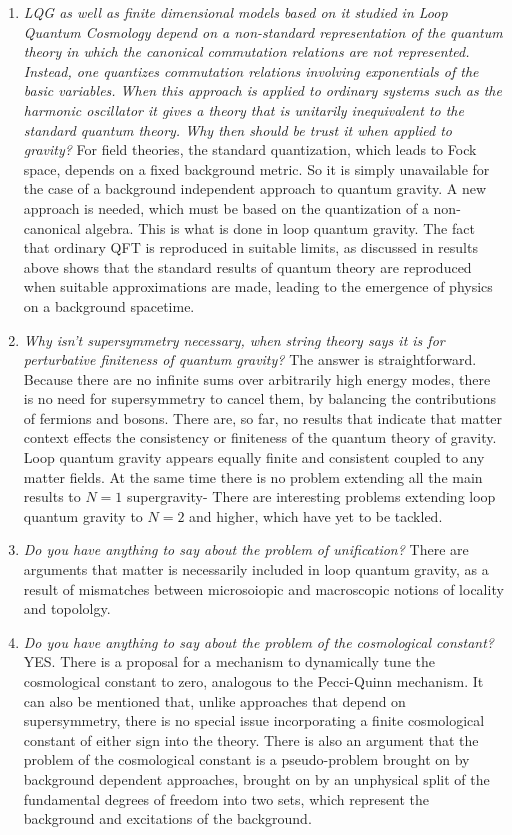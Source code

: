 \documentclass[12pt]{article}
\begin{document}
\begin{enumerate}
\item{}{\it LQG as well as finite dimensional models based on it studied
in Loop Quantum Cosmology depend on a non-standard representation
of the quantum theory in which the canonical commutation relations
are not represented. Instead, one quantizes commutation relations
involving  exponentials of the basic variables.  When this approach is applied to  ordinary systems such as the harmonic oscillator it gives a theory that is
unitarily inequivalent to the standard quantum theory.  Why then should be
trust it when applied to gravity?}   For field theories, the standard quantization,
which leads to Fock space, depends on a fixed background metric. So it is
simply unavailable for the case of a background independent approach to
quantum gravity.  A new approach is needed, which must be based on the
quantization of a non-canonical algebra.  This is what is done in loop quantum
gravity.  The fact that ordinary QFT is reproduced in suitable limits, as discussed
in results above shows that the standard results of quantum theory are 
reproduced when suitable approximations are made, leading to the emergence
of physics on a background spacetime.  
 

\item{}{\it  Why isn't supersymmetry necessary, when string theory says it is for
perturbative finiteness of quantum gravity?  }   The answer is straightforward. Because  there are no infinite sums over arbitrarily high energy modes,  there is no
need for supersymmetry to cancel them, by balancing the contributions of 
fermions and bosons. 
There are, so far,  
no results that indicate that matter context effects the consistency or finiteness
of the quantum theory of gravity.  Loop quantum gravity appears 
equally finite and consistent coupled to any matter fields. At the same time there 
is no problem extending all the main results to $N=1$ supergravity\cite{yime-holo}-\cite{11d}
There are
interesting problems extending loop quantum gravity to $N=2$ and higher, which
have yet to be tackled. 

\item{\it Do you have anything to say about the problem of unification?} 
There are arguments that matter is necessarily included in loop quantum
gravity, as a result of mismatches between microsoiopic and macroscopic
notions of locality\cite{unify} and topololgy\cite{louis-matter}.    


\item{\it Do you have anything to say about the problem of the cosmological
constant?}YES.   There is a proposal for a mechanism to dynamically tune the
cosmological constant to zero, analogous to the Pecci-Quinn 
mechanism\cite{stephon-cc}. 
It can also be mentioned that, unlike approaches that depend on supersymmetry, 
there is no special issue incorporating a finite cosmological constant of either sign
into the theory.  There is also an argument that the problem of
the cosmological constant is a pseudo-problem brought on by background
dependent approaches, brought on by an unphysical split of the fundamental degrees of freedom into two sets, which represent the background and
excitations of the background\cite{olaf-cc}. 


\end{enumerate}
\end{document}
